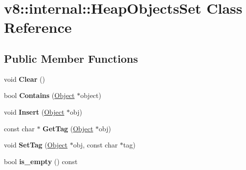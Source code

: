 \hypertarget{classv8_1_1internal_1_1_heap_objects_set}{}\section{v8\+:\+:internal\+:\+:Heap\+Objects\+Set Class Reference}
\label{classv8_1_1internal_1_1_heap_objects_set}
\subsection*{Public Member Functions}
\begin{DoxyCompactItemize}
\item 
void {\bfseries Clear} ()\hypertarget{classv8_1_1internal_1_1_heap_objects_set_a6718f74f54fe69aa7f684838939d3fa8}{}\label{classv8_1_1internal_1_1_heap_objects_set_a6718f74f54fe69aa7f684838939d3fa8}

\item 
bool {\bfseries Contains} (\hyperlink{classv8_1_1internal_1_1_object}{Object} $\ast$object)\hypertarget{classv8_1_1internal_1_1_heap_objects_set_a03b79360ff3a229f2b4065a714fade8a}{}\label{classv8_1_1internal_1_1_heap_objects_set_a03b79360ff3a229f2b4065a714fade8a}

\item 
void {\bfseries Insert} (\hyperlink{classv8_1_1internal_1_1_object}{Object} $\ast$obj)\hypertarget{classv8_1_1internal_1_1_heap_objects_set_a51f62e781c408b48b9790f0a9b1bcb46}{}\label{classv8_1_1internal_1_1_heap_objects_set_a51f62e781c408b48b9790f0a9b1bcb46}

\item 
const char $\ast$ {\bfseries Get\+Tag} (\hyperlink{classv8_1_1internal_1_1_object}{Object} $\ast$obj)\hypertarget{classv8_1_1internal_1_1_heap_objects_set_ab1b1310426df7a94540439298caf9887}{}\label{classv8_1_1internal_1_1_heap_objects_set_ab1b1310426df7a94540439298caf9887}

\item 
void {\bfseries Set\+Tag} (\hyperlink{classv8_1_1internal_1_1_object}{Object} $\ast$obj, const char $\ast$tag)\hypertarget{classv8_1_1internal_1_1_heap_objects_set_a4d7936c9c8bcd19a50787a5c92fda851}{}\label{classv8_1_1internal_1_1_heap_objects_set_a4d7936c9c8bcd19a50787a5c92fda851}

\item 
bool {\bfseries is\+\_\+empty} () const \hypertarget{classv8_1_1internal_1_1_heap_objects_set_a7e92066e51bef4f00b2de2d0d5fc5d4f}{}\label{classv8_1_1internal_1_1_heap_objects_set_a7e92066e51bef4f00b2de2d0d5fc5d4f}

\end{DoxyCompactItemize}

